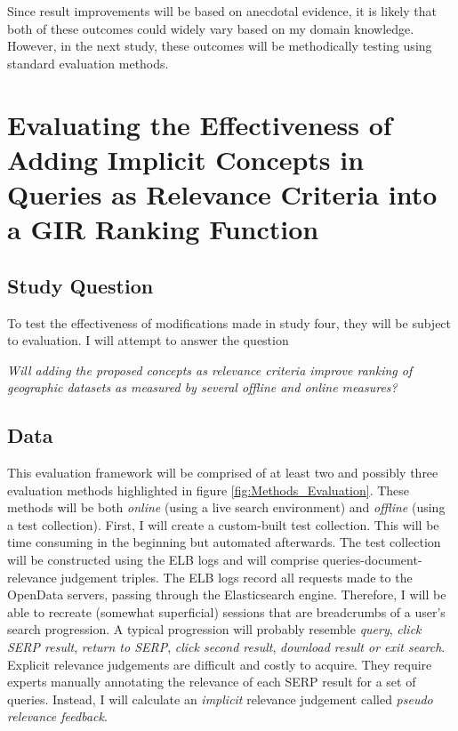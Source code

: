 Since result improvements will be based on anecdotal evidence, it is likely that both of these outcomes could widely vary based on my domain knowledge. However, in the next study, these outcomes will be methodically testing using standard evaluation methods.

\section{Evaluating the Effectiveness of Adding Implicit Concepts in Queries as Relevance Criteria into a GIR Ranking Function}

\subsection{Study Question}
To test the effectiveness of modifications made in study four, they will be subject to evaluation. I will attempt to answer the question
\linebreak

\emph{Will adding the proposed concepts as relevance criteria improve ranking of geographic datasets as measured by several offline and online measures?}
\linebreak

\subsection{Data}
This evaluation framework will be comprised of at least two and possibly three evaluation methods highlighted in figure \ref{fig:Methods_Evaluation}. These methods will be both \emph{online} (using a live search environment) and \emph{offline} (using a test collection). First, I will create a custom-built test collection. This will be time consuming in the beginning but automated afterwards. The test collection will be constructed using the ELB logs and will comprise queries-document-relevance judgement triples. The ELB logs record all requests made to the OpenData servers, passing through the Elasticsearch engine. Therefore, I will be able to recreate (somewhat superficial) sessions that are breadcrumbs of a user's search progression. A typical progression will probably resemble \emph{query}, \emph{click SERP result}, \emph{return to SERP}, \emph{click second result}, \emph{download result or exit search}. Explicit relevance judgements are difficult and costly to acquire. They require experts manually annotating the relevance of each SERP result for a set of queries. Instead, I will calculate an \emph{implicit} relevance judgement called \emph{pseudo relevance feedback}.

